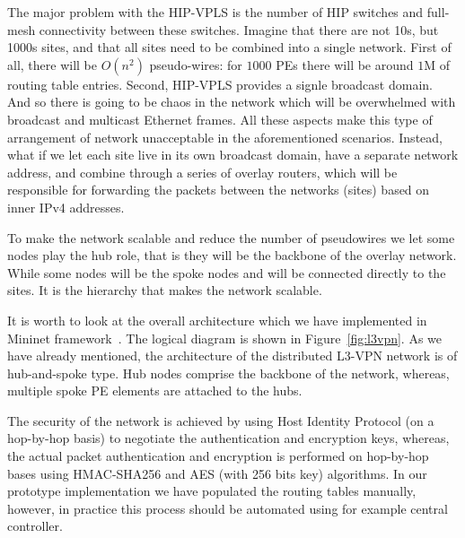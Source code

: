 The major problem with the HIP-VPLS is the number of HIP switches and
full-mesh connectivity between these switches. Imagine that there are 
not 10s, but 1000s sites, and that all sites need to be 
combined into a single network. First of all, there will be 
$O(n^2)$ pseudo-wires: for $1000$ PEs there will be  
around $1$M of routing table entries. Second, HIP-VPLS provides 
a signle broadcast domain. And so there is going to be 
chaos in the network which will be overwhelmed with broadcast
and multicast Ethernet frames. All these aspects make this type of
arrangement of network unacceptable in the aforementioned scenarios.
Instead, what if we let each site live in its own broadcast
domain, \ie have a separate network address, and combine through 
a series of overlay routers, which will be responsible for 
forwarding the packets between the networks (sites) based on 
inner IPv4 addresses. 

To make the network scalable and reduce the number of pseudowires
we let some nodes play the hub role, that is they will be the backbone 
of the overlay network. While some nodes will be the spoke nodes
and will be connected directly to the sites. It is the hierarchy 
that makes the network scalable. 

It is worth to look at the overall architecture which we have implemented in
Mininet framework~\cite{hip-l3vpn}. The logical diagram is shown in Figure~\ref{fig:l3vpn}. 
As we have already mentioned, the architecture of the distributed 
L3-VPN network is of hub-and-spoke type. Hub nodes comprise the backbone of the network, whereas,
multiple spoke PE elements are attached to the hubs. 

The security of the network is achieved by using Host Identity Protocol (on a hop-by-hop basis) to negotiate
the authentication and encryption keys, whereas, the actual packet authentication
and encryption is performed on hop-by-hop bases using HMAC-SHA256
and AES (with 256 bits key) algorithms. In our prototype implementation we 
have populated the routing tables manually, however, in practice this 
process should be automated using for example central controller. 

